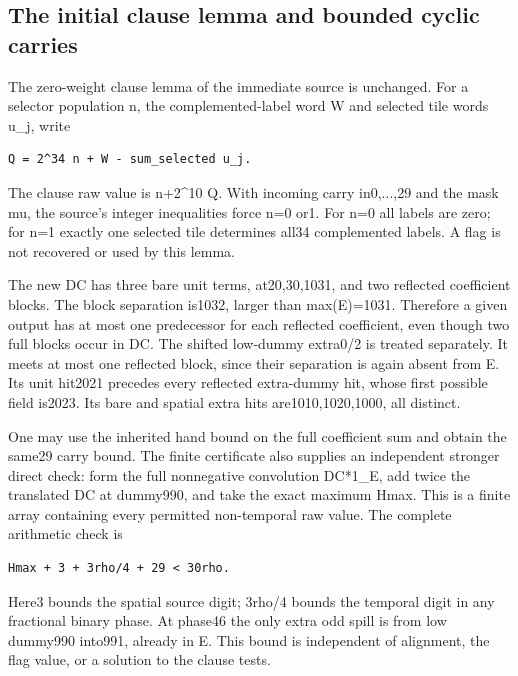 \subsection{The initial clause lemma and bounded cyclic carries}
The zero-weight clause lemma of the immediate source is unchanged. For a selector population n, the complemented-label word W and selected tile words u\_j, write

\begin{Verbatim}[fontsize=\small,breaklines=true,breakanywhere=true,breaksymbolleft={}]
Q = 2^34 n + W - sum_selected u_j.
\end{Verbatim}

The clause raw value is n+2\textasciicircum{}10 Q. With incoming carry in0,...,29 and the mask mu, the source's integer inequalities force n=0 or1. For n=0 all labels are zero; for n=1 exactly one selected tile determines all34 complemented labels. A flag is not recovered or used by this lemma.

The new DC has three bare unit terms, at20,30,1031, and two reflected coefficient blocks. The block separation is1032, larger than max(E)=1031. Therefore a given output has at most one predecessor for each reflected coefficient, even though two full blocks occur in DC. The shifted low-dummy extra0/2 is treated separately. It meets at most one reflected block, since their separation is again absent from E. Its unit hit2021 precedes every reflected extra-dummy hit, whose first possible field is2023. Its bare and spatial extra hits are1010,1020,1000, all distinct.

One may use the inherited hand bound on the full coefficient sum and obtain the same29 carry bound. The finite certificate also supplies an independent stronger direct check: form the full nonnegative convolution DC*1\_E, add twice the translated DC at dummy990, and take the exact maximum Hmax. This is a finite array containing every permitted non-temporal raw value. The complete arithmetic check is

\begin{Verbatim}[fontsize=\small,breaklines=true,breakanywhere=true,breaksymbolleft={}]
Hmax + 3 + 3rho/4 + 29 < 30rho.
\end{Verbatim}

Here3 bounds the spatial source digit; 3rho/4 bounds the temporal digit in any fractional binary phase. At phase46 the only extra odd spill is from low dummy990 into991, already in E. This bound is independent of alignment, the flag value, or a solution to the clause tests.

